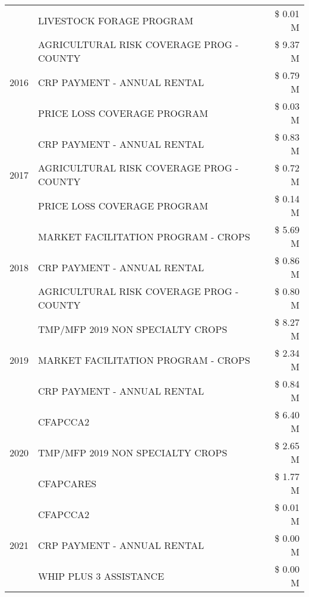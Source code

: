 \begin{tabular}{llr}
 & LIVESTOCK FORAGE PROGRAM & \$ 0.01 M \\
\cline{1-3}
\multirow[t]{3}{*}{2016} & AGRICULTURAL RISK COVERAGE PROG - COUNTY      & \$ 9.37 M \\
 & CRP PAYMENT - ANNUAL RENTAL                   & \$ 0.79 M \\
 & PRICE LOSS COVERAGE PROGRAM                   & \$ 0.03 M \\
\cline{1-3}
\multirow[t]{3}{*}{2017} & CRP PAYMENT - ANNUAL RENTAL & \$ 0.83 M \\
 & AGRICULTURAL RISK COVERAGE PROG - COUNTY & \$ 0.72 M \\
 & PRICE LOSS COVERAGE PROGRAM & \$ 0.14 M \\
\cline{1-3}
\multirow[t]{3}{*}{2018} & MARKET FACILITATION PROGRAM - CROPS & \$ 5.69 M \\
 & CRP PAYMENT - ANNUAL RENTAL & \$ 0.86 M \\
 & AGRICULTURAL RISK COVERAGE PROG - COUNTY & \$ 0.80 M \\
\cline{1-3}
\multirow[t]{3}{*}{2019} & TMP/MFP 2019 NON SPECIALTY CROPS & \$ 8.27 M \\
 & MARKET FACILITATION PROGRAM - CROPS & \$ 2.34 M \\
 & CRP PAYMENT - ANNUAL RENTAL & \$ 0.84 M \\
\cline{1-3}
\multirow[t]{3}{*}{2020} & CFAPCCA2 & \$ 6.40 M \\
 & TMP/MFP 2019 NON SPECIALTY CROPS & \$ 2.65 M \\
 & CFAPCARES & \$ 1.77 M \\
\cline{1-3}
\multirow[t]{3}{*}{2021} & CFAPCCA2 & \$ 0.01 M \\
 & CRP PAYMENT - ANNUAL RENTAL & \$ 0.00 M \\
 & WHIP PLUS 3 ASSISTANCE & \$ 0.00 M \\
\cline{1-3}
\bottomrule
\end{tabular}

